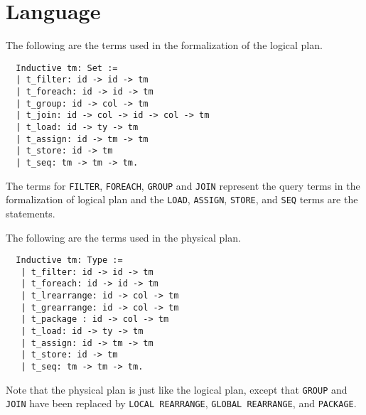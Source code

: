 \section{Language}
\label{sec:syntax}

The following are the terms used in the formalization of the logical plan.

\begin{lstlisting}
  Inductive tm: Set :=
  | t_filter: id -> id -> tm
  | t_foreach: id -> id -> tm
  | t_group: id -> col -> tm
  | t_join: id -> col -> id -> col -> tm
  | t_load: id -> ty -> tm
  | t_assign: id -> tm -> tm
  | t_store: id -> tm
  | t_seq: tm -> tm -> tm.
\end{lstlisting}

The terms for \texttt{FILTER}, \texttt{FOREACH}, \texttt{GROUP} and \texttt{JOIN} represent the query terms in the formalization of logical plan and the \texttt{LOAD}, \texttt{ASSIGN}, \texttt{STORE}, and \texttt{SEQ} terms are the statements.

The following are the terms used in the physical plan.

\begin{lstlisting}
  Inductive tm: Type :=
   | t_filter: id -> id -> tm
   | t_foreach: id -> id -> tm
   | t_lrearrange: id -> col -> tm
   | t_grearrange: id -> col -> tm
   | t_package : id -> col -> tm
   | t_load: id -> ty -> tm
   | t_assign: id -> tm -> tm
   | t_store: id -> tm
   | t_seq: tm -> tm -> tm.
\end{lstlisting}

Note that the physical plan is just like the logical plan, except that \texttt{GROUP} and \texttt{JOIN} have been replaced by \texttt{LOCAL REARRANGE},
\texttt{GLOBAL REARRANGE}, and \texttt{PACKAGE}.

